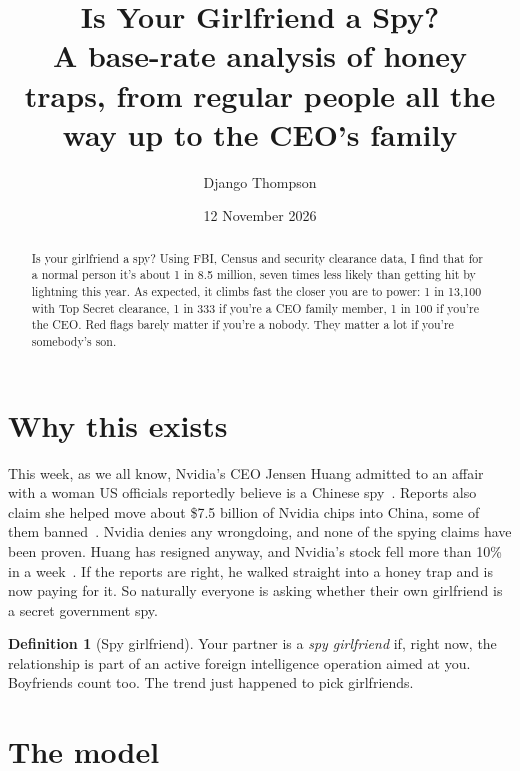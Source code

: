 \documentclass[11pt]{article}
\title{\textbf{Is Your Girlfriend a Spy?}\\[4pt] \large A base-rate analysis of honey traps, from regular people all the way up to the CEO's family}
\author{Django Thompson}
\date{12 November 2026}
\theoremstyle{definition}
\newtheorem{definition}{Definition}[section]
\begin{document}
\maketitle

\begin{abstract}
\noindent
Is your girlfriend a spy? Using FBI, Census and security clearance data, I find that for a normal person it's about 1 in 8.5 million, seven times less likely than getting hit by lightning this year. As expected, it climbs fast the closer you are to power: 1 in 13{,}100 with Top Secret clearance, 1 in 333 if you're a CEO family member, 1 in 100 if you're the CEO. Red flags barely matter if you're a nobody. They matter a lot if you're somebody's son.
\end{abstract}


\section{Why this exists}

This week, as we all know, Nvidia's CEO Jensen Huang admitted to an affair with a woman US officials reportedly believe is a Chinese spy~\cite{ap,tc}. Reports also claim she helped move about \$7.5 billion of Nvidia chips into China, some of them banned~\cite{tc}. Nvidia denies any wrongdoing, and none of the spying claims have been proven. Huang has resigned anyway, and Nvidia's stock fell more than 10\% in a week~\cite{tc,abc}. If the reports are right, he walked straight into a honey trap and is now paying for it. So naturally everyone is asking whether their own girlfriend is a secret government spy.

\begin{definition}[Spy girlfriend]
Your partner is a \emph{spy girlfriend} if, right now, the relationship is part of an active foreign intelligence operation aimed at you. Boyfriends count too. The trend just happened to pick girlfriends.
\end{definition}

\section{The model}
\end{document}
